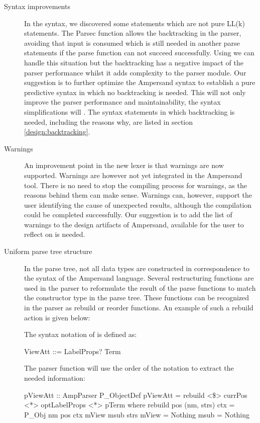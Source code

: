 \begin{description}
  \item[Syntax improvements]
    In the syntax, we discovered some statements which are not pure LL(k) statements.
    The Parsec  function allows the backtracking in the parser, avoiding that input is consumed which is still needed in another parse statements if the parse function can not succeed successfully.
    Using  we can handle this situation but the backtracking has a negative impact of the parser performance whilst it adds complexity to the parser module. 
    Our suggestion is to further optimize the Ampersand syntax to establish a pure predictive syntax in which no backtracking is needed.
    This will not only improve the parser performance and maintainability, the syntax simplifications will .
    The syntax statements in which backtracking is needed, including the reasons why, are listed in section \ref{design:backtracking}.

  \item[Warnings]
    An improvement point in the new lexer is that warnings are now supported. 
    Warnings are however not yet integrated in the Ampersand tool.
    There is no need to stop the compiling process for warnings, as the reasons behind them can make sense.
    Warnings can, however, support the user identifying the cause of unexpected results, although the compilation could be completed successfully.
    Our suggestion is to add the list of warnings to the design artifacts of Ampersand, available for the user to reflect on is needed.

  \item[Uniform parse tree structure]
  
   In the parse tree, not all data types are constructed in correspondence to the syntax of the Ampersand language.
   Several restructuring functions are used in the parser to reformulate the result of the parse functions to match the constructor type in the parse tree.
   These functions can be recognized in the parser as rebuild or reorder functions.
   An example of such a rebuild action is given below:

   The syntax notation of  is defined as:
   \begin{ebnf}
    ViewAtt ::= LabelProps? Term\end{ebnf}
   
   The parser function will use the order of the notation to extract the needed information:

   \begin{haskell}
  pViewAtt :: AmpParser P_ObjectDef
  pViewAtt = rebuild <\$> currPos <*> optLabelProps <*> pTerm
      where rebuild pos (nm, strs) ctx = P_Obj nm pos ctx mView msub strs
            mView = Nothing
            msub  = Nothing
   \end{haskell}
 

\end{description}

